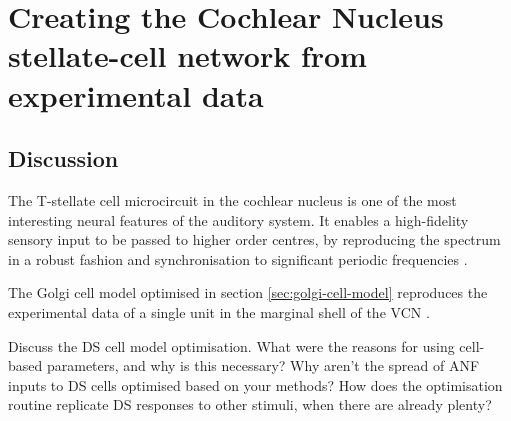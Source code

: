 \documentclass[11pt,a4paper,twoside]{book} %
\begin{document}


\chapter[Simple Responses]{Creating the Cochlear Nucleus stellate-cell network from experimental data}
\label{sec:SimpleResponsesChapter}





\newpage

\newpage

\newpage

\newpage
% 
\newpage



\section{Discussion}

  The T-stellate cell microcircuit in the
cochlear nucleus is one of the most interesting neural features of the
auditory system.  It enables a high-fidelity sensory input to be
passed to higher order centres, by reproducing the spectrum in a
robust fashion \citep{BlackburnSachs:1990,May:2003} and
synchronisation to significant periodic frequencies
\citep{KeilsonRichardsEtAl:1997}.


\medskip{} 

  The Golgi cell model optimised in section
\ref{sec:golgi-cell-model} reproduces the experimental data of a
single unit in the marginal shell of the VCN \citep{GhoshalKim:1997}.

\medskip{}

Discuss the DS cell model optimisation.  What were the reasons for
using cell-based parameters, and why is this necessary?  Why aren't
the spread of ANF inputs to DS cells optimised based on your methods?
How does the optimisation routine replicate DS responses to other
stimuli, when there are already plenty?
\end{document}
